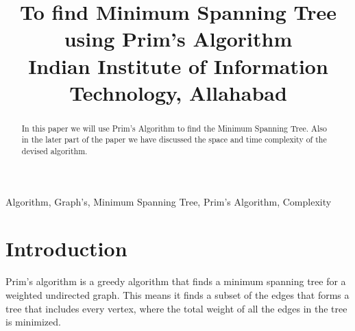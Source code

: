 \documentclass[conference]{IEEEtran}
\begin{document}
\title{To find Minimum Spanning Tree using Prim's Algorithm\\
{\footnotesize \textsuperscript {} Indian Institute of Information Technology, Allahabad}
}

\author{
\and
{}
\and
{}
}

\maketitle

\begin{abstract}
 In this paper we will use Prim's Algorithm to find the Minimum Spanning Tree. Also in the later part of the paper we have discussed the space and time complexity of the devised algorithm.
\end{abstract}

\begin{IEEEkeywords}
Algorithm, Graph's, Minimum Spanning Tree, Prim's Algorithm, Complexity
\end{IEEEkeywords}

\section{Introduction}
Prim's algorithm is a greedy algorithm that finds a minimum spanning tree for a weighted undirected graph. This means it finds a subset of the edges that forms a tree that includes every vertex, where the total weight of all the edges in the tree is minimized. 
\end{document}
